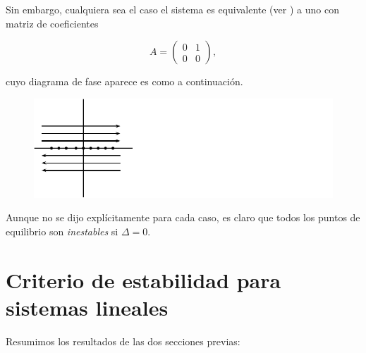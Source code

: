 Sin embargo, cualquiera sea el caso el sistema es equivalente (ver \cite[teorema 8.16 p.~239]{dynandbif}) a uno con matriz de coeficientes

$$ A = \left( \begin{array}{ll} 0 & 1 \\ 0 & 0 \end{array} \right),$$

cuyo diagrama de fase aparece es como a continuación.

\begin{figure}[!ht] \centering
    \includegraphics[scale=1.0]{figures/asingularr1.pdf}
\end{figure}

\begin{remark}Aunque no se dijo explícitamente para cada caso, es claro que todos los puntos de equilibrio son \emph{inestables} si $\Delta = 0$.
\end{remark}

\section{Criterio de estabilidad para sistemas lineales}
Resumimos los resultados de las dos secciones previas:


